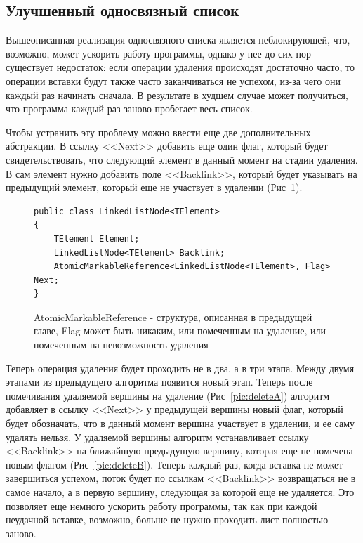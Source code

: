 \documentclass[12pt]{article}
\begin{document}
{			\subsection{Улучшенный односвязный список}
				\par Вышеописанная реализация односвязного списка является неблокирующей, что, возможно, может ускорить работу программы, однако у нее до сих пор существует недостаток: если операции удаления происходят достаточно часто, то операции вставки будут также часто заканчиваться не успехом, из-за чего они каждый раз начинать сначала. В результате в худшем случае может получиться, что программа каждый раз заново пробегает весь список.
				\par Чтобы устранить эту проблему можно ввести еще две дополнительных абстракции. В ссылку <<Next>> добавить еще один флаг, который будет свидетельствовать, что следующий элемент в данный момент на стадии удаления. В сам элемент нужно добавить поле <<Backlink>>, который будет указывать на предыдущий элемент, который еще не участвует в удалении (Рис~\ref{pic:backlink}). 
				\begin{figure}[h]
					\begin{lstlisting}
public class LinkedListNode<TElement>
{
	TElement Element;
	LinkedListNode<TElement> Backlink;
	AtomicMarkableReference<LinkedListNode<TElement>, Flag> Next;
}
					\end{lstlisting}
					\caption{AtomicMarkableReference - структура, описанная в предыдущей главе, Flag может быть никаким, или помеченным на удаление, или помеченным на невозможность удаления}
					\label{pic:backlink}
				\end{figure}
				Теперь операция удаления будет проходить не в два, а в три этапа. Между двумя этапами из предыдущего алгоритма появится новый этап. Теперь после помечивания удаляемой вершины на удаление (Рис~\ref{pic:deleteA}) алгоритм добавляет в ссылку <<Next>> у предыдущей вершины новый флаг, который будет обозначать, что в данный момент вершина участвует в удалении, и ее саму удалять нельзя. У удаляемой вершины алгоритм устанавливает ссылку <<Backlink>> на ближайшую предыдущую вершину, которая еще не помечена новым флагом (Рис~\ref{pic:deleteB}). Теперь каждый раз, когда вставка не может завершиться успехом, поток будет по ссылкам <<Backlink>> возвращаться не в самое начало, а в первую вершину, следующая за которой еще не удаляется. Это позволяет еще немного ускорить работу программы, так как при каждой неудачной вставке, возможно, больше не нужно проходить лист полностью заново.
				\begin{figure}[h!]

\end{figure}}
\end{document}
